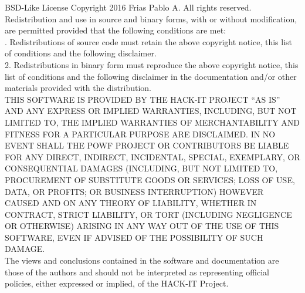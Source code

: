 \begin{frame}{BSD-Like License}
\tiny
Copyright 2016 Frias Pablo A. All rights reserved.\\ \medskip
Redistribution and use in source and binary forms, with or without modification, are permitted provided that the following conditions are met:\\ . Redistributions of source code must retain the above copyright notice, this list of conditions and the following disclaimer.\\
   2. Redistributions in binary form must reproduce the above copyright notice, this list of conditions and the following disclaimer in the documentation and/or other materials provided with the distribution.\\ \medskip
THIS SOFTWARE IS PROVIDED BY THE HACK-IT PROJECT ``AS IS'' AND ANY EXPRESS OR IMPLIED WARRANTIES, INCLUDING, BUT NOT LIMITED TO, THE IMPLIED WARRANTIES OF MERCHANTABILITY AND FITNESS FOR A PARTICULAR PURPOSE ARE DISCLAIMED. IN NO EVENT SHALL THE POWF PROJECT OR CONTRIBUTORS BE LIABLE FOR ANY DIRECT, INDIRECT, INCIDENTAL, SPECIAL, EXEMPLARY, OR CONSEQUENTIAL DAMAGES (INCLUDING, BUT NOT LIMITED TO, PROCUREMENT OF SUBSTITUTE GOODS OR SERVICES; LOSS OF USE, DATA, OR PROFITS; OR BUSINESS INTERRUPTION) HOWEVER CAUSED AND ON ANY THEORY OF LIABILITY, WHETHER IN CONTRACT, STRICT LIABILITY, OR TORT (INCLUDING NEGLIGENCE OR OTHERWISE) ARISING IN ANY WAY OUT OF THE USE OF THIS SOFTWARE, EVEN IF ADVISED OF THE POSSIBILITY OF SUCH DAMAGE.\\ \medskip
The views and conclusions contained in the software and documentation are those of the authors and should not be interpreted as representing official policies, either expressed or implied, of the HACK-IT Project.

\end{frame}
